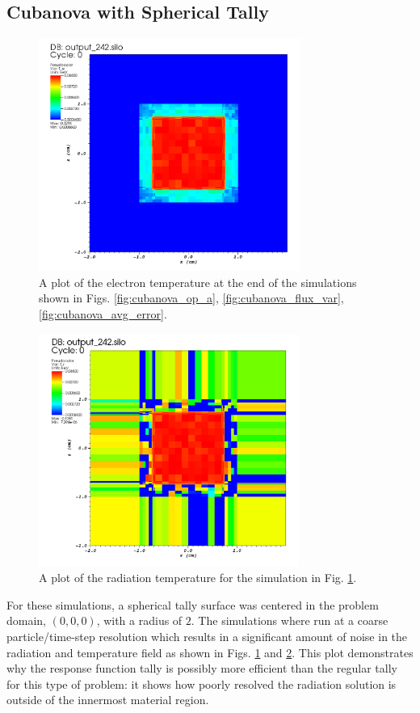 \subsection{Cubanova with Spherical Tally}

\begin{figure} [h!]
	\centering
	\includegraphics[height=3in]{VarReduction/plots/cubanova_T_e.png}
	\caption{A plot of the electron temperature at the end of the simulations shown in Figs. \ref{fig:cubanova_op_a}, \ref{fig:cubanova_flux_var}, \ref{fig:cubanova_avg_error}. }
	\label{fig:cubanova_T_e}
\end{figure}

\begin{figure} [h!]
	\centering
	\includegraphics[height=3in]{VarReduction/plots/cubanova_T_r.png}
	\caption{A plot of the radiation temperature for the simulation in Fig. \ref{fig:cubanova_T_e}.}
	\label{fig:cubanova_T_r}
\end{figure}

For these simulations, a spherical tally surface was centered in the problem domain, $(0,0,0)$, with a radius of $2$. The simulations where run at a coarse particle/time-step resolution which results in a significant amount of noise in the radiation and temperature field as shown in Figs. \ref{fig:cubanova_T_e} and \ref{fig:cubanova_T_r}. This plot demonstrates why the response function tally is possibly more efficient than the regular tally for this type of problem: it shows how poorly resolved the radiation solution is outside of the innermost material region.


